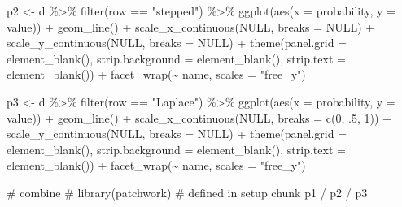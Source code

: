 \documentclass[
  letterpaper,
  DIV=11,
  numbers=noendperiod]{scrreprt}
\newenvironment{Shaded}{\begin{snugshade}}{\end{snugshade}}
\newcommand{\AttributeTok}[1]{\textcolor[rgb]{0.40,0.45,0.13}{#1}}
\newcommand{\CommentTok}[1]{\textcolor[rgb]{0.37,0.37,0.37}{#1}}
\newcommand{\ConstantTok}[1]{\textcolor[rgb]{0.56,0.35,0.01}{#1}}
\newcommand{\DecValTok}[1]{\textcolor[rgb]{0.68,0.00,0.00}{#1}}
\newcommand{\FunctionTok}[1]{\textcolor[rgb]{0.28,0.35,0.67}{#1}}
\newcommand{\InformationTok}[1]{\textcolor[rgb]{0.37,0.37,0.37}{#1}}
\newcommand{\NormalTok}[1]{\textcolor[rgb]{0.00,0.23,0.31}{#1}}
\newcommand{\OtherTok}[1]{\textcolor[rgb]{0.00,0.23,0.31}{#1}}
\newcommand{\SpecialCharTok}[1]{\textcolor[rgb]{0.37,0.37,0.37}{#1}}
\newcommand{\StringTok}[1]{\textcolor[rgb]{0.13,0.47,0.30}{#1}}
\begin{document}
\begin{Shaded}
\begin{Highlighting}[]
\NormalTok{p2 }\OtherTok{\textless{}{-}}
\NormalTok{  d }\SpecialCharTok{\%\textgreater{}\%}
  \FunctionTok{filter}\NormalTok{(row }\SpecialCharTok{==} \StringTok{"stepped"}\NormalTok{) }\SpecialCharTok{\%\textgreater{}\%} 
  \FunctionTok{ggplot}\NormalTok{(}\FunctionTok{aes}\NormalTok{(}\AttributeTok{x =}\NormalTok{ probability, }\AttributeTok{y =}\NormalTok{ value)) }\SpecialCharTok{+}
  \FunctionTok{geom\_line}\NormalTok{() }\SpecialCharTok{+}
  \FunctionTok{scale\_x\_continuous}\NormalTok{(}\ConstantTok{NULL}\NormalTok{, }\AttributeTok{breaks =} \ConstantTok{NULL}\NormalTok{) }\SpecialCharTok{+}
  \FunctionTok{scale\_y\_continuous}\NormalTok{(}\ConstantTok{NULL}\NormalTok{, }\AttributeTok{breaks =} \ConstantTok{NULL}\NormalTok{) }\SpecialCharTok{+}
  \FunctionTok{theme}\NormalTok{(}\AttributeTok{panel.grid =} \FunctionTok{element\_blank}\NormalTok{(),}
        \AttributeTok{strip.background =} \FunctionTok{element\_blank}\NormalTok{(),}
        \AttributeTok{strip.text =} \FunctionTok{element\_blank}\NormalTok{()) }\SpecialCharTok{+}
  \FunctionTok{facet\_wrap}\NormalTok{(}\SpecialCharTok{\textasciitilde{}}\NormalTok{ name, }\AttributeTok{scales =} \StringTok{"free\_y"}\NormalTok{)}

\NormalTok{p3 }\OtherTok{\textless{}{-}}
\NormalTok{  d }\SpecialCharTok{\%\textgreater{}\%}
  \FunctionTok{filter}\NormalTok{(row }\SpecialCharTok{==} \StringTok{"Laplace"}\NormalTok{) }\SpecialCharTok{\%\textgreater{}\%} 
  \FunctionTok{ggplot}\NormalTok{(}\FunctionTok{aes}\NormalTok{(}\AttributeTok{x =}\NormalTok{ probability, }\AttributeTok{y =}\NormalTok{ value)) }\SpecialCharTok{+}
  \FunctionTok{geom\_line}\NormalTok{() }\SpecialCharTok{+}
  \FunctionTok{scale\_x\_continuous}\NormalTok{(}\ConstantTok{NULL}\NormalTok{, }\AttributeTok{breaks =} \FunctionTok{c}\NormalTok{(}\DecValTok{0}\NormalTok{, .}\DecValTok{5}\NormalTok{, }\DecValTok{1}\NormalTok{)) }\SpecialCharTok{+}
  \FunctionTok{scale\_y\_continuous}\NormalTok{(}\ConstantTok{NULL}\NormalTok{, }\AttributeTok{breaks =} \ConstantTok{NULL}\NormalTok{) }\SpecialCharTok{+}
  \FunctionTok{theme}\NormalTok{(}\AttributeTok{panel.grid =} \FunctionTok{element\_blank}\NormalTok{(),}
        \AttributeTok{strip.background =} \FunctionTok{element\_blank}\NormalTok{(),}
        \AttributeTok{strip.text =} \FunctionTok{element\_blank}\NormalTok{()) }\SpecialCharTok{+}
  \FunctionTok{facet\_wrap}\NormalTok{(}\SpecialCharTok{\textasciitilde{}}\NormalTok{ name, }\AttributeTok{scales =} \StringTok{"free\_y"}\NormalTok{)}

\CommentTok{\# combine}
\CommentTok{\# library(patchwork) \# defined in setup chunk}
\NormalTok{p1 }\SpecialCharTok{/}\NormalTok{ p2 }\SpecialCharTok{/}\NormalTok{ p3}
\InformationTok{\textasciigrave{}\textasciigrave{}\textasciigrave{}}
\end{Highlighting}
\end{Shaded}
\end{document}
